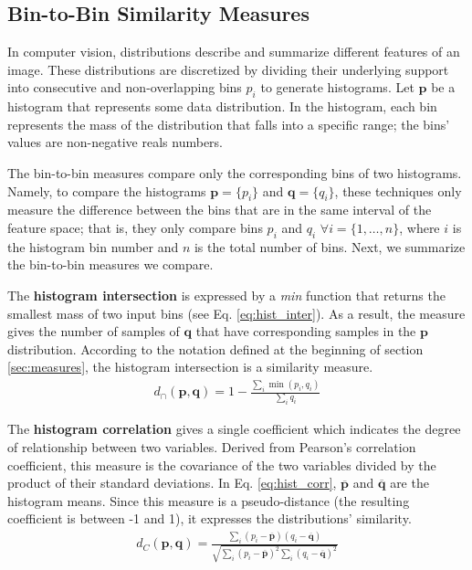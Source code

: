 \subsection{Bin-to-Bin Similarity Measures}
In computer vision, distributions describe and summarize different features of an image. These distributions are discretized by dividing their underlying support into consecutive and non-overlapping bins $p_i$ to generate histograms. Let $\mathbf{p}$ be a histogram that represents some data distribution. In the histogram, each bin represents the mass of the distribution that falls into a specific range; the bins' values are non-negative reals numbers.

The bin-to-bin measures compare only the corresponding bins of two histograms. Namely, to compare the histograms  $\mathbf{p} = \{p_i\}$ and $\mathbf{q} = \{q_i\}$, these techniques only measure the difference between the bins that are in the same interval of the feature space; that is, they only compare bins  $p_i$ and $q_i$ $\forall i=\{1, \ldots, n\}$, where $i$ is the histogram bin number and $n$ is the total number of bins. Next, we summarize the bin-to-bin measures we compare.

The \textbf{histogram intersection} \citep{Swain.Ballard:IJCV:1991} is expressed by a \textit{min} function that returns the smallest mass of two input bins (see Eq. \eqref{eq:hist_inter}). As a result, the measure gives the number of samples of $\mathbf{q}$ that have corresponding samples in the $\mathbf{p}$ distribution. According to the notation defined at the beginning of section \ref{sec:measures}, the histogram intersection is a similarity measure.
\begin{eqnarray}
d_{\cap}(\mathbf{p}, \mathbf{q}) = 1 - \frac{\sum_{i}\min(p_i, q_i)}{\sum_{i}q_i} \label{eq:hist_inter}
\end{eqnarray}

The \textbf{histogram correlation} gives a single coefficient which indicates the degree of relationship between two variables. Derived from Pearson's correlation coefficient, this measure is the covariance of the two variables divided by the product of their standard deviations. In Eq. \eqref{eq:hist_corr}, $\overline{\mathbf{p}}$ and $\overline{\mathbf{q}}$ are the histogram means. Since this measure is a pseudo-distance (the resulting coefficient is between -1 and 1), it expresses the distributions' similarity.  
\begin{eqnarray}
d_{C}(\mathbf{p}, \mathbf{q}) = \frac{\sum_{i}(p_i - \overline{\mathbf{p}})(q_i - \overline{\mathbf{q}})}{\sqrt{\sum_{i}(p_i - \overline{\mathbf{p}})^{2}\sum_{i}(q_i - \overline{\mathbf{q}})^{2}}} \label{eq:hist_corr}
\end{eqnarray}

